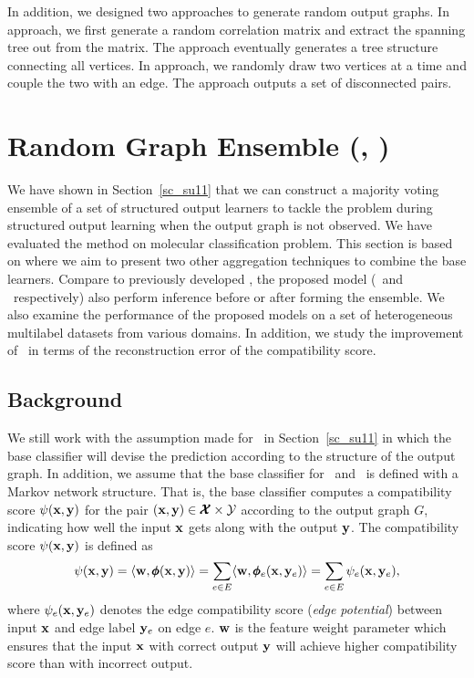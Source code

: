{In addition, we designed two approaches to generate random output graphs.
In  approach, we first generate a random correlation matrix and extract the spanning tree out from the matrix.
The approach eventually generates a tree structure connecting all vertices.
In  approach, we randomly draw two vertices at a time and couple the two with an edge.
The approach outputs a set of disconnected pairs.



%
%
\section{Random Graph Ensemble (\amm, \mam)} \label{sc_su14b}

We have shown in Section~\ref{sc_su11} that we can construct a majority voting ensemble of a set of structured output learners to tackle the problem during structured output learning when the output graph is not observed.
We have evaluated the method on molecular classification problem.
This section is based on  where we aim to present two other aggregation techniques to combine the base learners.
Compare to previously developed \mve, the proposed model (\amm\ and \mam\ respectively) also perform inference before or after forming the ensemble.
We also examine the performance of the proposed models on a set of heterogeneous multilabel datasets from various domains.
In addition, we study the improvement of \mam\ in terms of the reconstruction error of the compatibility score.



%
%
\subsection{Background}

We still work with the assumption made for \mve\ in Section~\ref{sc_su11} in which the base classifier will devise the prediction according to the structure of the output graph.
In addition, we assume that the base classifier for \amm\ and \mam\ is defined with a Markov network structure.
That is, the base classifier computes a compatibility score $\psi(\mathbf {x},\mathbf {y})$ for the pair $(\mathbf {x},\mathbf {y})\in\pmb {\mathcal{X}}\times\mathcal{Y}$ according to the output graph $G$, indicating how well the input $\mathbf {x}$ gets along with the output $\mathbf {y}$.
The compatibility score $\psi(\mathbf {x},\mathbf {y})$ is defined as
\begin{align*}
	\psi(\mathbf {x},\mathbf {y}) = \langle \mathbf {w}, \pmb \phi(\mathbf {x},\mathbf {y}) \rangle = \sum_{e\in E}\langle \mathbf {w}, \pmb \phi_e(\mathbf {x},\mathbf {y}_e) \rangle=\sum_{e\in E}\psi_e(\mathbf {x},\mathbf {y}_e),
\end{align*}
where $\psi_e(\mathbf {x},\mathbf {y}_e)$ denotes the edge compatibility score (\textit{edge potential}) between input $\mathbf {x}$ and edge label $\mathbf {y}_e$ on edge $e$.
$\mathbf {w}$ is the feature weight parameter which ensures that the input $\mathbf {x}$ with correct output $\mathbf {y}$ will achieve higher compatibility score than with incorrect output.

}
